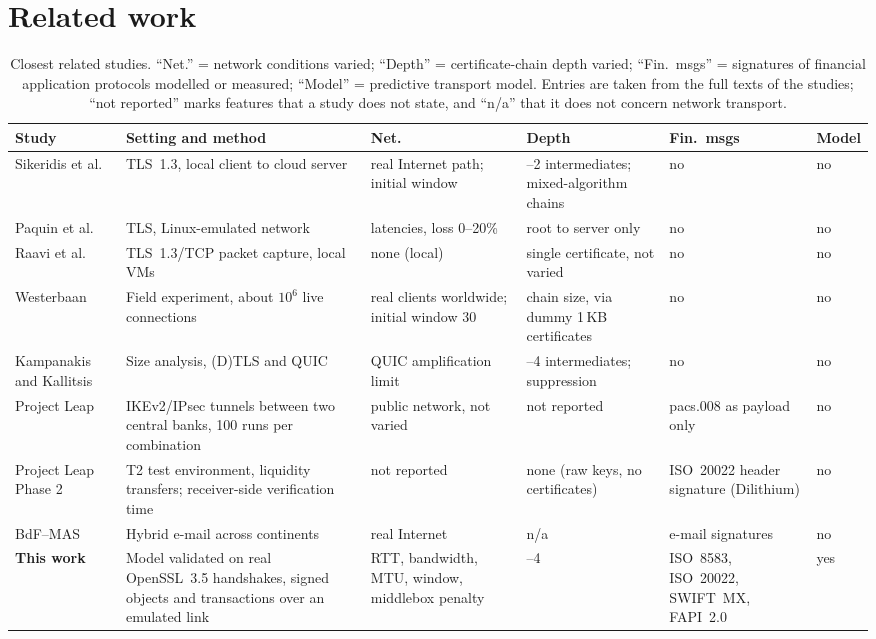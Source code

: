 \documentclass[preprint,12pt]{elsarticle}
\newcommand{\KB}{\,KB\xspace}
\begin{document}
\section{Related work}
\label{sec:related}
\begin{table}[tp]
\centering\footnotesize
\caption{Closest related studies. ``Net.'' = network conditions varied; ``Depth'' = certificate-chain depth varied; ``Fin.\ msgs'' = signatures of financial application protocols modelled or measured; ``Model'' = predictive transport model. Entries are taken from the full texts of the studies; ``not reported'' marks features that a study does not state, and ``n/a'' that it does not concern network transport.}
\label{tab:related}
\renewcommand{\arraystretch}{1.0}\setlength{\tabcolsep}{3pt}
\begin{tabularx}{\textwidth}{@{}>{\raggedright\arraybackslash}p{}>{\raggedright\arraybackslash}X>{\raggedright\arraybackslash}p{}>{\raggedright\arraybackslash}p{}>{\raggedright\arraybackslash}p{}>{\raggedright\arraybackslash}p{}@{}}
\toprule
Study & Setting and method & Net. & Depth & Fin.\ msgs & Model \\
\midrule
Sikeridis et al.~\cite{sikeridis2020} & TLS~1.3, local client to cloud server & real Internet path; initial window & 1--2 intermediates; mixed-algorithm chains & no & no \\
Paquin et al.~\cite{paquin2020} & TLS, Linux-emulated network & 4 latencies, loss 0--20\% & root to server only & no & no \\
Raavi et al.~\cite{raavi2025} & TLS~1.3/TCP packet capture, local VMs & none (local) & single certificate, not varied & no & no \\
Westerbaan \cite{westerbaan2021} & Field experiment, about $10^6$ live connections & real clients worldwide; initial window 30 & chain size, via dummy 1\KB certificates & no & no \\
Kampanakis and Kallitsis \cite{kampanakis2022} & Size analysis, (D)TLS and QUIC & QUIC amplification limit & 1--4 intermediates; suppression & no & no \\
Project Leap~\cite{bis_leap2023} & IKEv2/IPsec tunnels between two central banks, 100 runs per combination & public network, not varied & not reported & pacs.008 as payload only & no \\
Project Leap Phase 2~\cite{bis_leap2025} & T2 test environment, liquidity transfers; receiver-side verification time & not reported & none (raw keys, no certificates) & ISO~20022 header signature (Dilithium) & no \\
BdF--MAS~\cite{bdfmas2024} & Hybrid e-mail across continents & real Internet & n/a & e-mail signatures & no \\
\midrule
\textbf{This work} & Model validated on real OpenSSL~3.5 handshakes, signed objects and transactions over an emulated link & RTT, bandwidth, MTU, window, middlebox penalty & 1--4 & ISO~8583, ISO~20022, SWIFT~MX, FAPI~2.0 & yes \\
\bottomrule
\end{tabularx}
\end{table}
\end{document}
